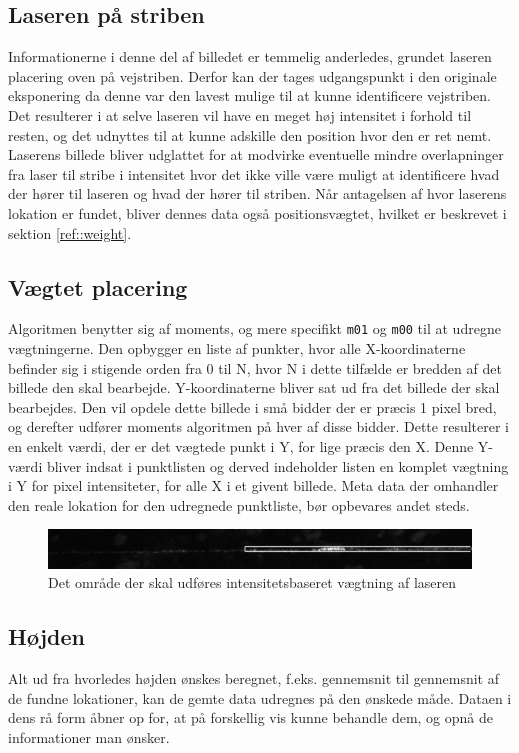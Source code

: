 \subsection{Laseren på striben}
Informationerne i denne del af billedet er temmelig anderledes, grundet laseren placering oven på vejstriben. Derfor kan der tages udgangspunkt i den originale eksponering da denne var den lavest mulige til at kunne identificere vejstriben. Det resulterer i at selve laseren vil have en meget høj intensitet i forhold til resten, og det udnyttes til at kunne adskille den position hvor den er ret nemt. Laserens billede bliver udglattet for at modvirke eventuelle mindre overlapninger fra laser til stribe i intensitet hvor det ikke ville være muligt at identificere hvad der hører til laseren og hvad der hører til striben. Når antagelsen af hvor laserens lokation er fundet, bliver dennes data også positionsvægtet, hvilket er beskrevet i sektion \ref{ref::weight}.

\subsection{Vægtet placering\label{ref::weight}}
Algoritmen benytter sig af moments, og mere specifikt \texttt{m01} og \texttt{m00} til at udregne vægtningerne.
Den opbygger en liste af punkter, hvor alle X-koordinaterne befinder sig i stigende orden fra 0 til N, hvor N i dette tilfælde er bredden af det billede den skal bearbejde.
Y-koordinaterne bliver sat ud fra det billede der skal bearbejdes. Den vil opdele dette billede i små bidder der er præcis 1 pixel bred, og derefter udfører moments algoritmen på hver af disse bidder. Dette resulterer i en enkelt værdi, der er det vægtede punkt i Y, for lige præcis den X. Denne Y-værdi bliver indsat i punktlisten og derved indeholder listen en komplet vægtning i Y for pixel intensiteter, for alle X i et givent billede. Meta data der omhandler den reale lokation for den udregnede punktliste, bør opbevares andet steds.

\begin{figure}[h]
	\centering
	\includegraphics[width=0.7\linewidth]{Billeder/base_5_boxing}
	\caption{Det område der skal udføres intensitetsbaseret vægtning af laseren}
	\label{fig:base_5_boxing}
\end{figure}

\subsection{Højden}
Alt ud fra hvorledes højden ønskes beregnet, f.eks. gennemsnit til gennemsnit af de fundne lokationer, kan de gemte data udregnes på den ønskede måde. Dataen i dens rå form åbner op for, at på forskellig vis kunne behandle dem, og opnå de informationer man ønsker.

